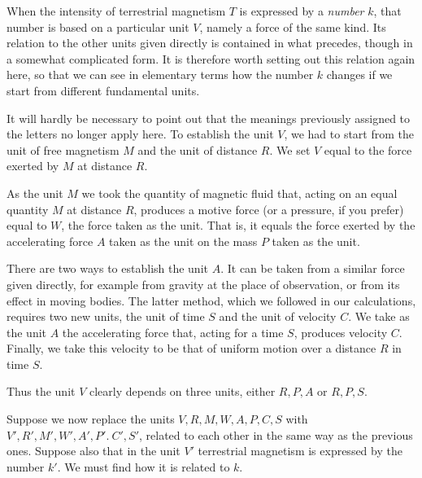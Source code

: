 When the intensity of terrestrial magnetism $T$ is expressed by a \textit{number} $k$, that number is based on a particular unit $V$, namely a force of the same kind. Its relation to the other units given directly is contained in what precedes, though in a somewhat complicated form. It is therefore worth setting out this relation again here, so that we can see in elementary terms how the number $k$ changes if we start from different fundamental units.

\expandafter\def\csname HistoricalNoteText13\endcsname{It will hardly be necessary to point out that the meanings previously assigned to the letters no longer apply here.}
To establish the unit $V$, we had to start from the unit of free magnetism $M$ and the unit of distance $R$. We set $V$ equal to the force exerted by $M$ at distance $R$.

As the unit $M$ we took the quantity of magnetic fluid that, acting on an equal quantity $M$ at distance $R$, produces a motive force (or a pressure, if you prefer) equal to $W$, the force taken as the unit. That is, it equals the force exerted by the accelerating force $A$ taken as the unit on the mass $P$ taken as the unit.

There are two ways to establish the unit $A$. It can be taken from a similar force given directly, for example from gravity at the place of observation, or from its effect in moving bodies. The latter method, which we followed in our calculations, requires two new units, the unit of time $S$ and the unit of velocity $C$. We take as the unit $A$ the accelerating force that, acting for a time $S$, produces velocity $C$. Finally, we take this velocity to be that of uniform motion over a distance $R$ in time $S$.

Thus the unit $V$ clearly depends on three units, either $R,P,A$ or $R,P,S$.

Suppose we now replace the units $V,R,M,W,A,P,C,S$ with $V',\allowbreak R',\allowbreak M',\allowbreak W',\allowbreak A',\allowbreak P'.\allowbreak\ C',\allowbreak S'$, related to each other in the same way as the previous ones. Suppose also that in the unit $V'$ terrestrial magnetism is expressed by the number $k'$. We must find how it is related to $k$.

